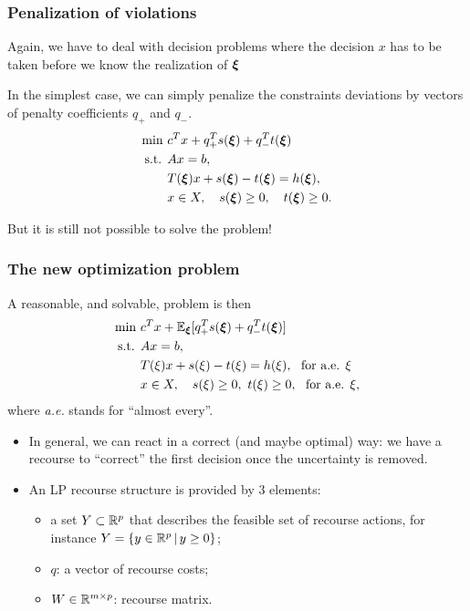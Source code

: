 \documentclass[aspectratio=169]{beamer}
\begin{document}
\begin{frame}
	\frametitle{Penalization of violations}
	
	Again, we have to deal with decision problems where the decision $x$ has to be taken before we know the realization of ${\boldsymbol{\xi}}$
	
	In the simplest case, we can simply penalize the constraints deviations by vectors of penalty coefficients $q_+$ and $q_-$.
	\begin{align*}
	\min\ & c^Tx+q^T_+s({\boldsymbol{\xi}})+q^T_-t({\boldsymbol{\xi}}) \\
	\mbox{s.t. } & Ax = b, \\
	& T({\boldsymbol{\xi}})x + s({\boldsymbol{\xi}})-t({\boldsymbol{\xi}}) = h({\boldsymbol{\xi}}), \\
	& x \in X, \quad s({\boldsymbol{\xi}}) \geq 0, \quad t({\boldsymbol{\xi}}) \geq 0.
	\end{align*}
	
	\mbox{}
	
	But it is still not possible to solve the problem!
	
\end{frame}

\begin{frame}
	\frametitle{The new optimization problem}
	
	A reasonable, and solvable, problem is then
	\begin{align*}
	\min\ & c^Tx+{\mathbb{E}}_{{\boldsymbol{\xi}}}[q^T_+s({\boldsymbol{\xi}})+q^T_-t({\boldsymbol{\xi}})] \\
	\mbox{s.t. } & Ax = b, \\
	& T(\xi)x + s(\xi)-t(\xi) = h(\xi),\ \text{ for a.e. } \xi \\
	& x \in X, \quad s(\xi) \geq 0,\ t(\xi) \geq 0,\ \text{ for a.e. } \xi,
	\end{align*}
where {\it a.e.} stands for ``almost every''.
	\begin{itemize}
		\item
		In general, we can react in a correct (and maybe optimal) way: we have a recourse to ``correct'' the first decision once the uncertainty is removed.
		\item
		An LP recourse structure is provided by 3 elements:
		\begin{itemize}
			\item
			a set $Y \subset {\mathbb{R}}^p$ that describes the feasible set of recourse actions, for instance $Y = \lbrace y \in {\mathbb{R}}^p \,|\, y \geq 0 \rbrace$;
			\item
			$q$: a vector of recourse costs;
			\item
			$W \in {\mathbb{R}}^{m \times p}$: {\blue recourse matrix}.
		\end{itemize}
	\end{itemize}
	
\end{frame}
\end{document}
